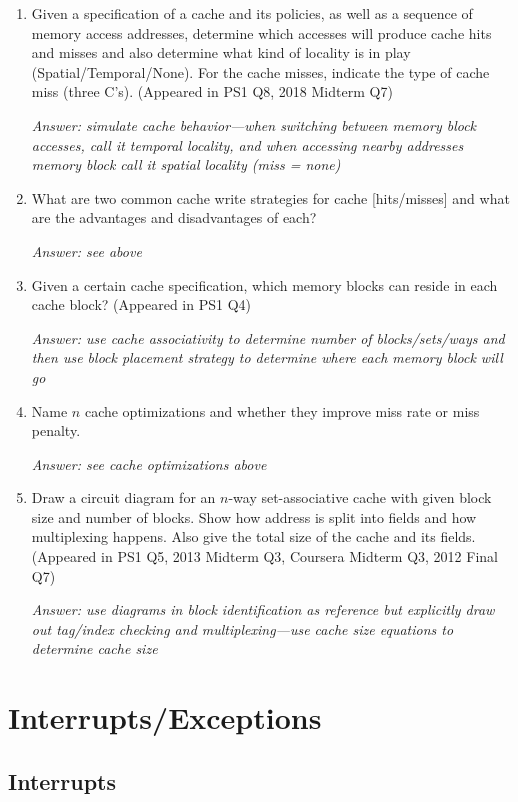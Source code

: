 \documentclass{article}
\begin{document}
\begin{enumerate}
\item Given a specification of a cache and its policies, as well as a sequence of memory access addresses, determine which accesses will produce cache hits and misses and also determine what kind of locality is in play (Spatial/Temporal/None). For the cache misses, indicate the type of cache miss (three C's). (Appeared in PS1 Q8, 2018 Midterm Q7)

\textit{Answer: simulate cache behavior---when switching between memory block accesses, call it temporal locality, and when accessing nearby addresses memory block call it spatial locality (miss = none)}

\item What are two common cache write strategies for cache [hits/misses] and what are the advantages and disadvantages of each?

\textit{Answer: see above}

\item Given a certain cache specification, which memory blocks can reside in each cache block? (Appeared in PS1 Q4)

\textit{Answer: use cache associativity to determine number of blocks/sets/ways and then use block placement strategy to determine where each memory block will go}

\item Name $n$ cache optimizations and whether they improve miss rate or miss penalty.

\textit{Answer: see cache optimizations above}

\item Draw a circuit diagram for an $n$-way set-associative cache with given block size and number of blocks. Show how address is split into fields and how multiplexing happens. Also give the total size of the cache and its fields. (Appeared in PS1 Q5, 2013 Midterm Q3, Coursera Midterm Q3, 2012 Final Q7)

\textit{Answer: use diagrams in block identification as reference but explicitly draw out tag/index checking and multiplexing---use cache size equations to determine cache size}
\end{enumerate}

\section{Interrupts/Exceptions}

\subsection{Interrupts}
\end{document}
